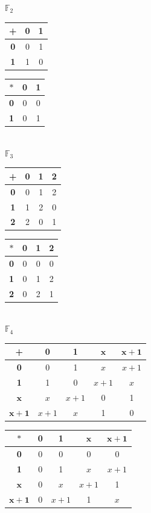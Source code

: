\documentclass[a4paper]{article}
\begin{document}
\begin{center}
$\mathbb{F}_2 $\\
\begin{tabular}{|c|c|c|}
  \hline
  + & \textbf{0} & \textbf{1} \\
  \hline
  \textbf{0} & 0 & 1 \\
  \hline
  \textbf{1} & 1 & 0 \\
  \hline
\end{tabular}
\begin{tabular}{|c|c|c|}
  \hline
  $*$ & \textbf{0} & \textbf{1} \\
  \hline
  \textbf{0} & 0 & 0\\
  \hline
  \textbf{1} & 0 & 1\\
  \hline
\end{tabular}\\
\vspace{1\baselineskip}
$\mathbb{F}_3 $\\
\begin{tabular}{|c|c|c|c|}
  \hline
  + & \textbf{0} & \textbf{1} & \textbf{2} \\
  \hline
  \textbf{0} & 0 & 1 & 2 \\
  \hline
  \textbf{1} & 1 & 2 & 0 \\
  \hline
  \textbf{2} & 2 & 0 & 1 \\
  \hline
\end{tabular}
\begin{tabular}{|c|c|c|c|}
  \hline
  $*$ & \textbf{0} & \textbf{1} & \textbf{2} \\
  \hline
  \textbf{0} & 0 & 0 & 0 \\
  \hline
  \textbf{1} & 0 & 1 & 2 \\
  \hline
  \textbf{2} & 0 & 2 & 1 \\
  \hline
\end{tabular}\\
\vspace{1\baselineskip}
$\mathbb{F}_4$\\
\begin{tabular}{|c|c|c|c|c|}
  \hline
  + & \textbf{0} & \textbf{1} & $\bm{x}$ & $\bm{x+1}$ \\
  \hline
  \textbf{0} & 0 & 1 & $x$ & $x+1$ \\
  \hline
  \textbf{1} & 1 & 0 & $x+1$ & $x$ \\
  \hline
  $\bm{x}$ & $x$ & $x+1$ & 0 & 1 \\
  \hline
  $\bm{x+1}$ & $x+1$ & $x$ & 1 & 0 \\
  \hline
\end{tabular}
\begin{tabular}{|c|c|c|c|c|}
  \hline
  $*$ & \textbf{0} & \textbf{1} & $\bm{x}$ & $\bm{x+1}$ \\
  \hline
  \textbf{0} & 0 & 0 & 0 & 0 \\
  \hline
  \textbf{1} & 0 & 1 & $x$ & $x+1$ \\
  \hline
  $\bm{x}$ & 0 & $x$ & $x+1$ & 1 \\
  \hline
  $\bm{x+1}$ & 0 & $x+1$ & 1 & $x$\\
  \hline
\end{tabular}
\end{center}
\end{document}
